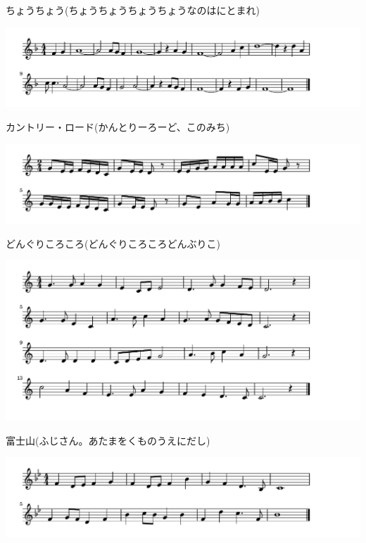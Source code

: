 \documentclass[a4paper]{ltjsarticle}
\begin{document}
\vspace{-10mm} \hspace{10mm}
ちょうちょう(ちょうちょうちょうちょうなのはにとまれ)

\includegraphics[clip]{countryroad_crop.pdf}

\vspace{-10mm} \hspace{10mm}
カントリー・ロード(かんとりーろーど、このみち)

\includegraphics[clip]{donguri_crop.pdf}

\vspace{-10mm} \hspace{10mm}
どんぐりころころ(どんぐりころころどんぶりこ)

\includegraphics[clip]{fujisan_crop.pdf}

\vspace{-10mm} \hspace{10mm}
富士山(ふじさん。あたまをくものうえにだし)

\includegraphics[clip]{harugakita_crop.pdf}
\end{document}
